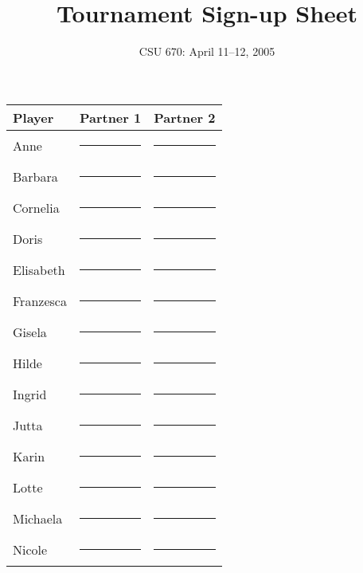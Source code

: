 \documentclass[11pt]{article}
\begin{document}
\title{Tournament Sign-up Sheet}
\author{CSU 670: April 11--12, 2005}

\maketitle

\begin{center}\begin{tabular}{l|l|l} \hline
Player & Partner 1 & Partner 2 \\ \hline \hline

Anne & \rule{0pt}{30pt}\rule{2in}{0pt} & \rule{0pt}{30pt}\rule{2in}{0pt} \\ \hline
Barbara & \rule{0pt}{30pt}\rule{2in}{0pt} & \rule{0pt}{30pt}\rule{2in}{0pt} \\ \hline
Cornelia & \rule{0pt}{30pt}\rule{2in}{0pt} & \rule{0pt}{30pt}\rule{2in}{0pt} \\ \hline
Doris & \rule{0pt}{30pt}\rule{2in}{0pt} & \rule{0pt}{30pt}\rule{2in}{0pt} \\ \hline
Elisabeth & \rule{0pt}{30pt}\rule{2in}{0pt} & \rule{0pt}{30pt}\rule{2in}{0pt} \\ \hline
Franzesca & \rule{0pt}{30pt}\rule{2in}{0pt} & \rule{0pt}{30pt}\rule{2in}{0pt} \\ \hline
Gisela & \rule{0pt}{30pt}\rule{2in}{0pt} & \rule{0pt}{30pt}\rule{2in}{0pt} \\ \hline
Hilde & \rule{0pt}{30pt}\rule{2in}{0pt} & \rule{0pt}{30pt}\rule{2in}{0pt} \\ \hline
Ingrid & \rule{0pt}{30pt}\rule{2in}{0pt} & \rule{0pt}{30pt}\rule{2in}{0pt} \\ \hline
Jutta & \rule{0pt}{30pt}\rule{2in}{0pt} & \rule{0pt}{30pt}\rule{2in}{0pt} \\ \hline
Karin & \rule{0pt}{30pt}\rule{2in}{0pt} & \rule{0pt}{30pt}\rule{2in}{0pt} \\ \hline
Lotte & \rule{0pt}{30pt}\rule{2in}{0pt} & \rule{0pt}{30pt}\rule{2in}{0pt} \\ \hline
Michaela & \rule{0pt}{30pt}\rule{2in}{0pt} & \rule{0pt}{30pt}\rule{2in}{0pt} \\ \hline
Nicole & \rule{0pt}{30pt}\rule{2in}{0pt} & \rule{0pt}{30pt}\rule{2in}{0pt} \\ \hline
\end{tabular}\end{center}

\thispagestyle{empty}
\end{document}
